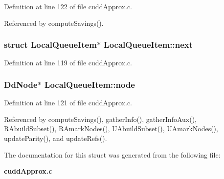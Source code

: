 Definition at line 122 of file cudd\-Approx.c.

Referenced by compute\-Savings().
\subsubsection{\setlength{\rightskip}{0pt plus 5cm}struct \bf{Local\-Queue\-Item}$\ast$ \bf{Local\-Queue\-Item::next}}\label{structLocalQueueItem_69e408e4fd07700c21fdaa3bc77d9cc4}




Definition at line 119 of file cudd\-Approx.c.
\subsubsection{\setlength{\rightskip}{0pt plus 5cm}\bf{Dd\-Node}$\ast$ \bf{Local\-Queue\-Item::node}}\label{structLocalQueueItem_4feb3f7962ce071cda1a1383b8fcbcfe}




Definition at line 121 of file cudd\-Approx.c.

Referenced by compute\-Savings(), gather\-Info(), gather\-Info\-Aux(), RAbuild\-Subset(), RAmark\-Nodes(), UAbuild\-Subset(), UAmark\-Nodes(), update\-Parity(), and update\-Refs().

The documentation for this struct was generated from the following file:\begin{CompactItemize}
\item 
\bf{cudd\-Approx.c}\end{CompactItemize}
